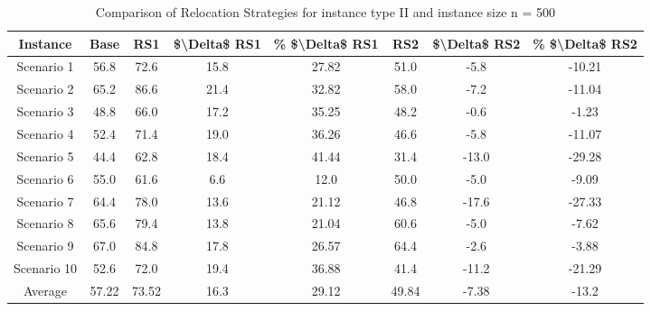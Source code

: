\begin{table}[H]
\centering
\begin{tabular}{cccccccc}
  \hline
  \textbf{Instance} & \textbf{Base} & \textbf{RS1} & \textbf{\$\textbackslash{}Delta\$  RS1} & \textbf{\% \$\textbackslash{}Delta\$  RS1} & \textbf{RS2} & \textbf{\$\textbackslash{}Delta\$  RS2} & \textbf{\% \$\textbackslash{}Delta\$  RS2} \\\hline
  Scenario 1 & 56.8 & 72.6 & 15.8 & 27.82 & 51.0 & -5.8 & -10.21 \\
  Scenario 2 & 65.2 & 86.6 & 21.4 & 32.82 & 58.0 & -7.2 & -11.04 \\
  Scenario 3 & 48.8 & 66.0 & 17.2 & 35.25 & 48.2 & -0.6 & -1.23 \\
  Scenario 4 & 52.4 & 71.4 & 19.0 & 36.26 & 46.6 & -5.8 & -11.07 \\
  Scenario 5 & 44.4 & 62.8 & 18.4 & 41.44 & 31.4 & -13.0 & -29.28 \\
  Scenario 6 & 55.0 & 61.6 & 6.6 & 12.0 & 50.0 & -5.0 & -9.09 \\
  Scenario 7 & 64.4 & 78.0 & 13.6 & 21.12 & 46.8 & -17.6 & -27.33 \\
  Scenario 8 & 65.6 & 79.4 & 13.8 & 21.04 & 60.6 & -5.0 & -7.62 \\
  Scenario 9 & 67.0 & 84.8 & 17.8 & 26.57 & 64.4 & -2.6 & -3.88 \\
  Scenario 10 & 52.6 & 72.0 & 19.4 & 36.88 & 41.4 & -11.2 & -21.29 \\
  Average & 57.22 & 73.52 & 16.3 & 29.12 & 49.84 & -7.38 & -13.2 \\\hline
\end{tabular}
\caption{Comparison of Relocation Strategies for instance type II and instance size n = 500}
\label{tab:wait:resrelocation-comparison_II_500}
\end{table}
